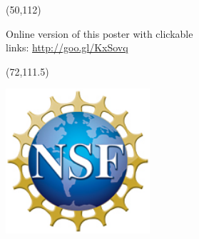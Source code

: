 \documentclass[final]{beamer}
\begin{document}
\begin{frame}{}
\begin{textblock}{24.0}(50,112)
\begin{flushleft}
Online version of this poster with clickable \\
links: \href{http://goo.gl/KxSovq}{http://goo.gl/KxSovq}
\end{flushleft}
\end{textblock}

\begin{textblock}{10.0}(72,111.5)
\begin{flushright}
\includegraphics[width=0.4\textwidth]{images/nsf1.jpg}
\end{flushright}
\end{textblock}


\end{frame}
\end{document}
